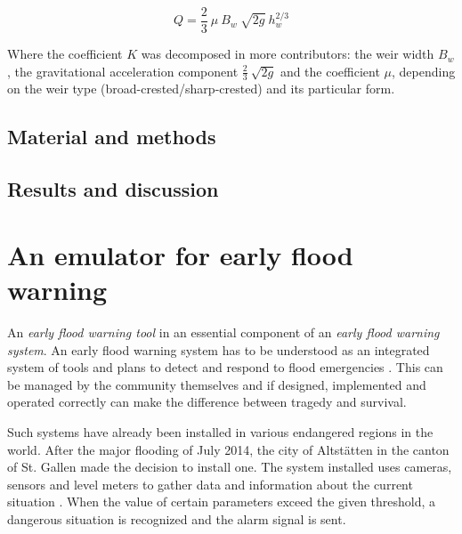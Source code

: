 \begin{equation}
  Q = \frac{2}{3}\: \mu\: B_w\: \sqrt{2g}\: h_w^{2/3}
\end{equation}

\noindent Where the coefficient $K$ was decomposed in more contributors: the weir width $B_w$, the gravitational acceleration component $\frac{2}{3}\: \sqrt{2g}$  and the coefficient $\mu$, depending on the weir type (broad-crested/sharp-crested) and its particular form.



\subsection{Material and methods}


\subsection{Results and discussion}



\section{An emulator for early flood warning}



An \textit{early flood warning tool} in an essential component of an \textit{early flood warning system}.
An early flood warning system has to be understood as an integrated system of tools and plans to detect and respond to flood emergencies \autocite{icimod_early_2018}.
This can be managed by the community themselves and if designed, implemented and operated correctly can make the difference between tragedy and survival.

Such systems have already been installed in various endangered regions in the world.
After the major flooding of July 2014, the city of Altstätten in the canton of St. Gallen made the decision to install one.
The system installed uses cameras, sensors and level meters to gather data and information about the current situation \autocite{st._galler_tageblatt_altstatten_2017}.
When the value of certain parameters exceed the given threshold, a dangerous situation is recognized and the alarm signal is sent.

